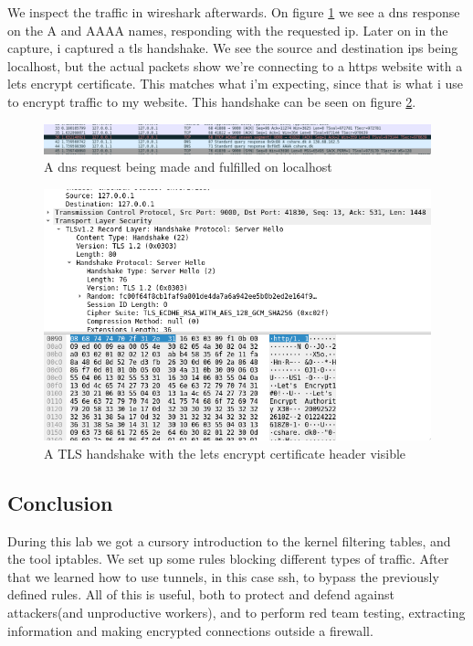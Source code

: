 \documentclass{article}
\begin{document}
We inspect the traffic in wireshark afterwards. On figure \ref{fig:wireshark} we see
a dns response on the A and AAAA names, responding with the requested ip. Later
on in the capture, i captured a tls handshake. We see the source and destination ips
being localhost, but the actual packets show we're connecting to a https website with
a lets encrypt certificate. This matches what i'm expecting, since that is what i use
to encrypt traffic to my website. This handshake can be seen on figure 
\ref{fig:wireshark2}.
\begin{figure}
    \centering
    \includegraphics[width=0.7\linewidth]{dns_exchange.png}
    \caption{A dns request being made and fulfilled on localhost}
    \label{fig:wireshark}
\end{figure}
\begin{figure}
    \centering
    \includegraphics[width=0.7\linewidth]{tls_handshake_with_le.png}
    \caption{A TLS handshake with the lets encrypt certificate header visible}
    \label{fig:wireshark2}
\end{figure}
\subsection{Conclusion}
During this lab we got a cursory introduction to the kernel filtering tables, and the
tool iptables. We set up some rules blocking different types of traffic. After that
we learned how to use tunnels, in this case ssh, to bypass the previously defined rules.
All of this is useful, both to protect and defend against attackers(and unproductive
workers), and to perform red team testing, extracting information and making encrypted
connections outside a firewall.
\end{document}
